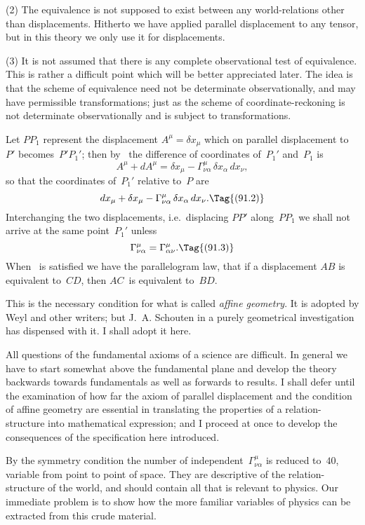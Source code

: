 \documentclass[12pt]{book}
\begin{document}
(2) The equivalence is not supposed to exist between any world\hyp{}relations
other than displacements. Hitherto we have applied parallel displacement to
any tensor, but in this theory we only use it for displacements.

(3) It is not assumed that there is any complete observational test of
equivalence. This is rather a difficult point which will be better appreciated
later. The idea is that the scheme of equivalence need not be determinate
observationally, and may have permissible transformations; just as the scheme
of coordinate\hyp{}reckoning is not determinate observationally and is subject to
transformations.

Let $PP_{1}$ represent the displacement $A^{\mu} = \delta x_{\mu}$ which on parallel displacement
to~$P'$ becomes~$P'P_{1}'$; then by~ the difference of coordinates of~$P_{1}'$
and~$P_{1}$ is
\[
A^{\mu} + dA^{\mu} = \delta x_{\mu} - \Gamma_{\nu\alpha}^{\mu}\, \delta x_{\alpha}\, dx_{\nu},
\]
so that the coordinates of~$P_{1}'$ relative to~$P$ are
\[
dx_{\mu} + \delta x_{\mu} - \Gamma_{\nu\alpha}^{\mu}\, \delta x_{\alpha}\, dx_{\nu}.
\Tag{(91.2)}
\]
Interchanging the two displacements, i.e.\ displacing $PP'$ along~$PP_{1}$ we shall
not arrive at the same point~$P_{1}'$ unless
\[
\Gamma_{\nu\alpha}^{\mu} = \Gamma_{\alpha\nu}^{\mu}.
\Tag{(91.3)}
\]
When ~is satisfied we have the parallelogram law, that if a displacement
$AB$ is equivalent to~$CD$, then $AC$~is equivalent to~$BD$.

This is the necessary condition for what is called \emph{affine geometry}. It is
%
%
adopted by Weyl and other writers; but J.~A. Schouten in a purely geometrical
investigation has dispensed with it. I shall adopt it here.

All questions of the fundamental axioms of a science are difficult. In
general we have to start somewhat above the fundamental plane and develop
the theory backwards towards fundamentals as well as forwards to results. I
shall defer until  the examination of how far the axiom of parallel displacement
and the condition of affine geometry are essential in translating the
properties of a relation\hyp{}structure into mathematical expression; and I proceed
at once to develop the consequences of the specification here introduced.

By the symmetry condition the number of independent~$\Gamma_{\nu\alpha}^{\mu}$ is reduced to~$40$,
variable from point to point of space. They are descriptive of the relation\hyp{}structure
of the world, and should contain all that is relevant to physics. Our
immediate problem is to show how the more familiar variables of physics can
be extracted from this crude material.
\end{document}
